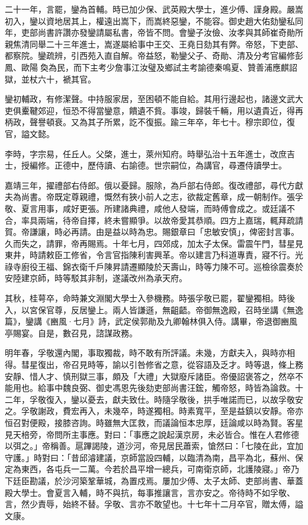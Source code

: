 \begin{pinyinscope}
二十一年，言罷，鑾為首輔。時已加少保、武英殿大學士，進少傅、謹身殿。嚴嵩初入，鑾以資地居其上，權遠出嵩下，而嵩終惡鑾，不能容。御史趙大佑劾鑾私同年，吏部尚書許讚亦發鑾請屬私書，帝皆不問。會鑾子汝儉、汝孝與其師崔奇勛所親焦清同舉二十三年進士，嵩遂屬給事中王交、王堯日劾其有弊。帝怒，下吏部、都察院。鑾疏辨，引西苑入直自解。帝益怒，勒鑾父子、奇勛、清及分考官編修彭鳳、歐陽奐為民，而下主考少詹事江汝璧及鄉試主考諭德秦鳴夏、贊善浦應麒詔獄，並杖六十，褫其官。

鑾初輔政，有修潔聲。中持服家居，至困頓不能自給。其用行邊起也，諸邊文武大吏俱櫜鞬郊迎，恒恐不得當鑾意，饋遺不貲。事竣，歸裝千輛，用以遺貴近，得再柄政，聲譽頓衰。又為其子所累，訖不復振。踰三年卒，年七十。穆宗即位，復官，謚文懿。

李時，字宗易，任丘人。父棨，進士，萊州知府。時舉弘治十五年進士，改庶吉士，授編修。正德中，歷侍讀、右諭德。世宗嗣位，為講官，尋遷侍讀學士。

嘉靖三年，擢禮部右侍郎。俄以憂歸。服除，為戶部右侍郎。復改禮部，尋代方獻夫為尚書。帝既定尊親禮，慨然有狹小前人之志，欲裁定舊章，成一朝制作。張孚敬、夏言用事，咸好更張。所建諸典禮，咸他人發端，而時傅會成之。或廷議不合，率具兩端，待帝自擇，終未嘗顯爭。以故帝愛其恭順。四方上嘉瑞，輒拜疏請賀。帝謙讓，時必再請。由是益以時為忠。賜銀章曰「忠敏安慎」，俾密封言事。久而失之，請罪，帝再賜焉。十年七月，四郊成，加太子太保。雷震午門，彗星見東井，時請敕臣工修省，令言官指陳利害興革。帝以建言乃科道專責，寢不行。光祿寺廚役王福、錦衣衛千戶陳昇請遷顯陵於天壽山，時等力陳不可。巡檢徐震奏於安陸建京師，時等駁其非制，遂議改州為承天府。

其秋，桂萼卒，命時兼文淵閣大學士入參機務。時張孚敬已罷，翟鑾獨相。時後入，以宮保官尊，反居鑾上。兩人皆謙遜，無齟齬。帝御無逸殿，召時坐講《無逸篇》，鑾講《豳風·七月》詩，武定侯郭勛及九卿翰林俱入侍。講畢，帝退御豳風亭賜宴。自是，數召見，諮謀政務。

明年春，孚敬還內閣，事取獨裁，時不敢有所評議。未幾，方獻夫入，與時亦相得。彗星復出，帝召見時等，諭以引咎修省之意，從容語及乏才。時等退，條上務安靜、惜人才、慎刑獄三事，頗及「大禮」大獄廢斥諸臣。帝優詔褒答之，然卒不能用也。給事中魏良弼、御史馮恩先後劾吏部尚書汪鋐，觸帝怒，時皆為論救。十二年，孚敬復入，鑾以憂去，獻夫致仕。時隨孚敬後，拱手唯諾而已，以故孚敬安之。孚敬謝政，費宏再入，未幾卒，時遂獨相。時素寬平，至是益鎮以安靜。帝亦恒召對便殿，接膝咨詢。時雖無大匡救，而議論恒本忠厚，廷論咸以時為賢。客星見天棓旁，帝問所主事應。對曰：「事應之說起漢京房，未必皆合。惟在人君修德以弭之。」帝稱善。扈蹕謁陵，道沙河，帝見居民蕭索，愴然曰：「七陵在此，宜加守護。」時對曰：「昔邱濬建議，京師當設四輔，以臨清為南，昌平為北，蘇州、保定為東西，各屯兵一二萬。今若於昌平增一總兵，可南衛京師，北護陵寢。」帝乃下廷臣勘議，於沙河築鞏華城，為置戍焉。屢加少傅、太子太師、吏部尚書、華蓋殿大學士。會夏言入輔，時不與抗，每事推讓言，言亦安之。帝待時不如孚敬、言，然少責辱，始終不替。孚敬、言亦不敢望也。十七年十二月卒官，贈太傅，謚文康。


\end{pinyinscope}
